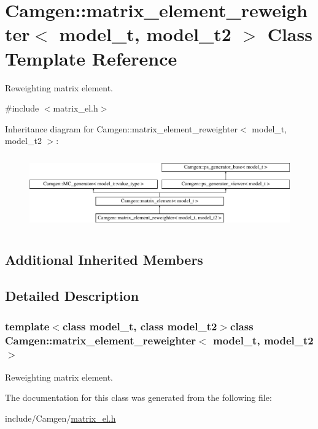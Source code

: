 \hypertarget{a00364}{}\section{Camgen\+:\+:matrix\+\_\+element\+\_\+reweighter$<$ model\+\_\+t, model\+\_\+t2 $>$ Class Template Reference}
\label{a00364}


Reweighting matrix element.  




{\ttfamily \#include $<$matrix\+\_\+el.\+h$>$}

Inheritance diagram for Camgen\+:\+:matrix\+\_\+element\+\_\+reweighter$<$ model\+\_\+t, model\+\_\+t2 $>$\+:\begin{figure}[H]
\begin{center}
\leavevmode
\includegraphics[height=3.218391cm]{a00364}
\end{center}
\end{figure}
\subsection*{Additional Inherited Members}


\subsection{Detailed Description}
\subsubsection*{template$<$class model\+\_\+t, class model\+\_\+t2$>$class Camgen\+::matrix\+\_\+element\+\_\+reweighter$<$ model\+\_\+t, model\+\_\+t2 $>$}

Reweighting matrix element. 

The documentation for this class was generated from the following file\+:\begin{DoxyCompactItemize}
\item 
include/\+Camgen/\hyperlink{a00689}{matrix\+\_\+el.\+h}\end{DoxyCompactItemize}
